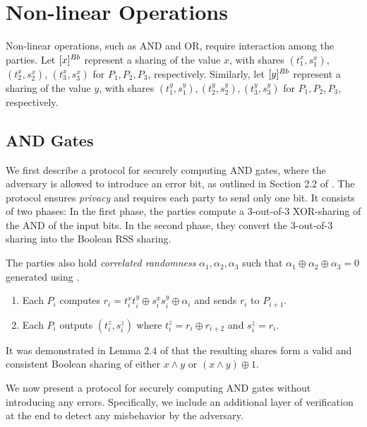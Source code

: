 \section{Non-linear Operations}

Non-linear operations, such as AND and OR, require interaction among the parties. Let $[x]^{Bb}$ represent a sharing of the value $x$, with shares $(t^x_1, s^x_1)$, $(t^x_2, s^x_2)$, $(t^x_3, s^x_3)$ for $P_1, P_2, P_3$, respectively.
Similarly, let $[y]^{Bb}$ represent a sharing of the value $y$, with shares $(t^y_1, s^y_1), (t^y_2, s^y_2), (t^y_3, s^y_3)$ for $P_1, P_2, P_3$, respectively.

\subsection{AND Gates}

We first describe a protocol for securely computing AND gates, where the adversary is allowed to introduce an error bit, as outlined in Section 2.2 of \cite{EC:FLNW17}. The protocol ensures {\it privacy} and requires each party to send only one bit. It consists of two phases:
In the first phase, the parties compute a $3$-out-of-$3$ XOR-sharing of the AND of the input bits. In the second phase, they convert the $3$-out-of-$3$ sharing into the Boolean RSS sharing.

The parties also hold \emph{correlated randomness} $\alpha_1, \alpha_2, \alpha_3$ such that $\alpha_1 \oplus \alpha_2 \oplus \alpha_3 = 0$ generated using {\bf \RandZero}.

\begin{protocol}
    \label{protocol:AndwithError}
    \begin{enumerate}
        \item Each $P_i$ computes $r_i = t^x_i t^y_i \oplus s^x_i s^y_i \oplus \alpha_i$ and sends $r_i$ to $P_{i + 1}$.
        \item Each $P_i$ outputs $(t^z_i, s^z_i)$ where $t^z_i = r_i \oplus r_{i + 2}$ and $s^z_i = r_i$.
    \end{enumerate}
\end{protocol}

It was demonstrated in Lemma $2.4$ of \cite{CCS:AFLNO16} that the resulting shares form a valid and consistent Boolean sharing of either $x \wedge y$ or $(x \wedge y) \oplus 1$.

We now present a protocol for securely computing AND gates without introducing any errors.
Specifically, we include an additional layer of verification at the end to detect any misbehavior by the adversary.

